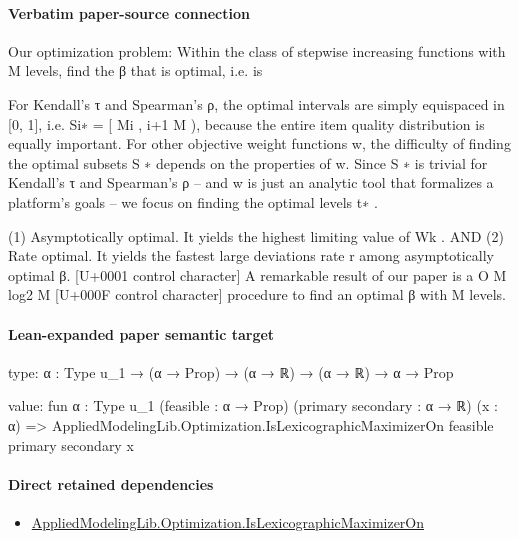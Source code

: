 \documentclass[10pt]{article}
\begin{document}
\paragraph{Verbatim paper-source connection}
\begin{ReviewVerbatim}
Our optimization problem: Within the class of
stepwise increasing functions with M levels, find the
β that is optimal, i.e. is

For Kendall’s τ and Spearman’s ρ, the optimal intervals are simply equispaced in [0, 1], i.e. Si∗ =
[ Mi , i+1
M ), because the entire item quality distribution is equally important. For other objective weight
functions w, the difficulty of finding the optimal subsets S ∗ depends on the properties of w. Since S ∗ is
trivial for Kendall’s τ and Spearman’s ρ – and w
is just an analytic tool that formalizes a platform’s
goals – we focus on finding the optimal levels t∗ .

(1) Asymptotically optimal. It yields the highest limiting value of Wk . AND
(2) Rate optimal. It yields the fastest large deviations rate r among asymptotically optimal β.
[U+0001 control character]
A remarkable result of our paper is a O M log2 M
[U+000F control character]
procedure to find an optimal β with M levels.
\end{ReviewVerbatim}



\paragraph{Lean-expanded paper semantic target}
\begin{ReviewVerbatim}
type:
{α : Type u_1} → (α → Prop) → (α → ℝ) → (α → ℝ) → α → Prop

value:
fun {α : Type u_1} (feasible : α → Prop) (primary secondary : α → ℝ) (x : α) =>
  AppliedModelingLib.Optimization.IsLexicographicMaximizerOn feasible primary secondary x
\end{ReviewVerbatim}

\paragraph{Direct retained dependencies}
\begin{itemize}\raggedright
\item \hyperlink{governing-declaration-508c4e6a797747f7}{Applied\allowbreak{}Modeling\allowbreak{}Lib.\allowbreak{}Optimization.\allowbreak{}Is\allowbreak{}Lexicographic\allowbreak{}Maximizer\allowbreak{}On}
\end{itemize}
\end{document}
